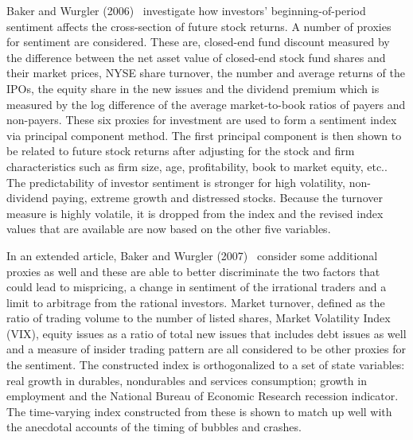  
 Baker and Wurgler (2006)~\cite{baker2006investor} investigate how investors' beginning-of-period sentiment affects the cross-section of future stock returns. A number of proxies for sentiment are considered. These are, closed-end fund discount measured by the difference between the net asset value of closed-end stock fund shares and their market prices, NYSE share turnover, the number and average returns of the IPOs, the equity share in the new issues and the dividend premium which is measured by the log difference of the average market-to-book ratios of payers and non-payers. These six proxies for investment are used to form a sentiment index via principal component method. The first principal component is then shown to be related to future stock returns after adjusting for the stock and firm characteristics such as firm size, age, profitability, book to market equity, etc.. The predictability of investor sentiment is stronger for high volatility, non-dividend paying, extreme growth and distressed stocks. Because the turnover measure is highly volatile, it is dropped from the index and the revised index values that are available are now based on the other five variables. 
 
 
In an extended article, Baker and Wurgler (2007)~\cite{baker2007investor} consider some additional proxies as well and these are able to better discriminate the two factors that could lead to mispricing, a change in sentiment of the irrational traders and a limit to arbitrage from the rational investors. Market turnover, defined as the ratio of trading volume to the number of listed shares, Market Volatility Index (VIX), equity issues as a ratio of total new issues that includes debt issues as well and a measure of insider trading pattern are all considered to be other proxies for the sentiment. The constructed index is orthogonalized to a set of state variables: real growth in durables, nondurables and services consumption; growth in employment and the National Bureau of Economic Research recession indicator. The time-varying index constructed from these is shown to match up well with the anecdotal accounts of the timing of bubbles and crashes.
 
